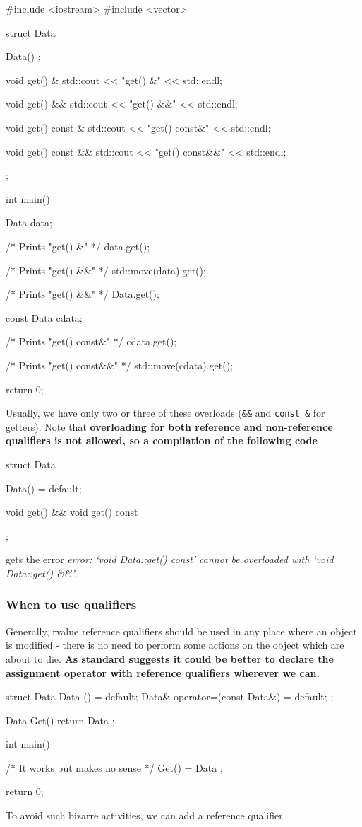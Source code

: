 \documentclass[../main]{subfiles}
\begin{document}
\begin{Code}
    #include <iostream>
    #include <vector>
    
    struct Data
    {
        Data() {};
    
        void get() &
        {
            std::cout << "get() &" << std::endl;
        }
    
        void get() &&
        {
            std::cout << "get() &&" << std::endl;
        }
    
        void get() const &
        {
            std::cout << "get() const&" << std::endl;
        }
    
        void get() const &&
        {
            std::cout << "get() const&&" << std::endl;
        }
    };
    
    int main()
    {
        Data data;
        
        /* Prints "get() &" */
        data.get();
        
        /* Prints "get() &&" */
        std::move(data).get();
        
        /* Prints "get() &&" */
        Data{}.get();
    
    
        const Data cdata;
        
        /* Prints "get() const&" */
        cdata.get();

        /* Prints "get() const&&" */
        std::move(cdata).get();
    
        return 0;
    }
\end{Code}

    Usually, we have only two or three of these overloads (\texttt{\&\&} and \texttt{const \&} for getters). Note that
\textbf{overloading for both reference and non-reference qualifiers is not allowed, so a compilation of the following code}
\begin{Code}
    struct Data
    {
        Data() = default;
        
        void get() && {}
        void get() const {}
    };
\end{Code}
gets the error \textit{error: ‘void Data::get() const’ cannot be overloaded with ‘void Data::get() \&\&’}.

\subsubsection{When to use qualifiers}
    Generally, rvalue reference qualifiers should be used in any place where an object is modified - there is no need to perform some actions
on the object which are about to die.
\textbf{As standard suggests it could be better to declare the
assignment operator with reference qualifiers wherever we can.}
\begin{Code}
    struct Data
    {
        Data () = default;
        Data& operator=(const Data&) = default;
    };
    
    Data Get()
    {
        return Data {};
    }
    
    int main()
    {
        /* It works but makes no sense */
        Get() = Data {};
    
        return 0;
    }
\end{Code}
\noindent
To avoid such bizarre activities, we can add a reference qualifier
\end{document}
